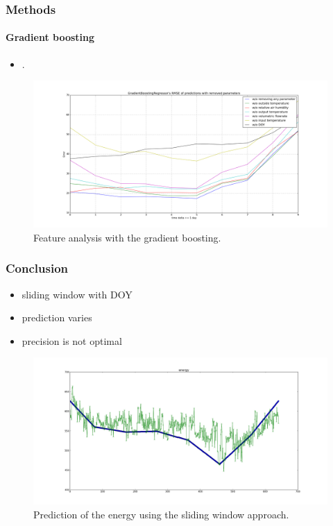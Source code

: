 \documentclass{beamer}
\begin{document}
\begin{frame}
\frametitle{Methods}
\framesubtitle{Gradient boosting}

\begin{itemize}
\item .
\end{itemize}


\begin{figure}[H]
  \includegraphics[width=0.6\linewidth]{img/GradientBoostingRegressor_day_error_without_some_params.png}
  \caption{Feature analysis with the gradient boosting.}
  \label{fig:gradientboost}
\end{figure}

\end{frame}

\begin{frame}
\frametitle{Conclusion}


\begin{itemize}
\item sliding window with DOY
\item prediction varies
\item precision is not optimal
\end{itemize}

\begin{figure}[H]
  \includegraphics[width=0.8\linewidth]{img/predict-energy-53--0p520.png}
  \caption{Prediction of the energy using the sliding window approach.}
  \label{fig:Prediction}
\end{figure}

\end{frame}
\end{document}
